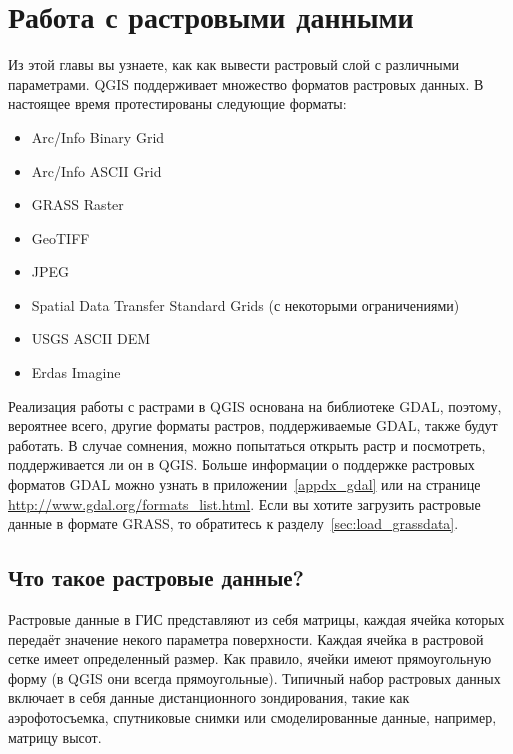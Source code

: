 
\chapter{Работа с растровыми данными}\label{label_raster}


Из этой главы вы узнаете, как как вывести растровый слой с различными параметрами.
QGIS поддерживает множество форматов растровых данных. В настоящее время
протестированы следующие форматы:

\begin{itemize}[label=--]
\item Arc/Info Binary Grid
\item Arc/Info ASCII Grid
\item GRASS Raster
\item GeoTIFF
\item JPEG
\item Spatial Data Transfer Standard Grids (с некоторыми ограничениями)
\item USGS ASCII DEM
\item Erdas Imagine
\end{itemize}

Реализация работы с растрами в QGIS основана на библиотеке GDAL, поэтому,
вероятнее всего, другие форматы растров, поддерживаемые GDAL, также будут работать.
В случае сомнения, можно попытаться открыть растр и посмотреть,
поддерживается ли он в QGIS. Больше информации о поддержке растровых
форматов GDAL можно узнать в приложении~\ref{appdx_gdal}
или на странице \url{http://www.gdal.org/formats_list.html}. Если вы хотите
загрузить растровые данные в формате GRASS, то обратитесь к
разделу~\ref{sec:load_grassdata}.

\section{Что такое растровые данные?}\label{label_whatsraster}

Растровые данные в ГИС представляют из себя матрицы, каждая ячейка которых
передаёт значение некого параметра поверхности. Каждая ячейка в
растровой сетке имеет определенный размер. Как правило, ячейки имеют
прямоугольную форму (в QGIS они всегда прямоугольные). Типичный набор
растровых данных включает в себя данные дистанционного зондирования,
такие как аэрофотосъемка, спутниковые снимки или смоделированные данные,
например, матрицу высот.

